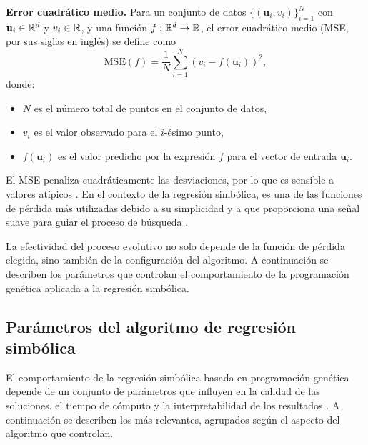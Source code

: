 \textbf{Error cuadrático medio.} Para un conjunto de datos \(\{(\mathbf{u}_i, v_i)\}_{i=1}^{N}\) con \(\mathbf{u}_i \in \mathbb{R}^d\) y \(v_i \in \mathbb{R}\), y una función \(f: \mathbb{R}^d \to \mathbb{R}\), el error cuadrático medio (MSE, por sus siglas en inglés) se define como \begin{equation} \text{MSE}(f) = \frac{1}{N} \sum_{i=1}^{N} \left( v_i - f(\mathbf{u}_i) \right)^2, \end{equation} donde: \begin{itemize} \item \(N\) es el número total de puntos en el conjunto de datos, \item \(v_i\) es el valor observado para el \(i\)-ésimo punto, \item \(f(\mathbf{u}_i)\) es el valor predicho por la expresión \(f\) para el vector de entrada \(\mathbf{u}_i\). \end{itemize} El MSE penaliza cuadráticamente las desviaciones, por lo que es sensible a valores atípicos \cite{hastie2009elements}. En el contexto de la regresión simbólica, es una de las funciones de pérdida más utilizadas debido a su simplicidad y a que proporciona una señal suave para guiar el proceso de búsqueda \cite{bishop2006pattern}.

La efectividad del proceso evolutivo no solo depende de la función de pérdida elegida, sino también de la configuración del algoritmo. A continuación se describen los parámetros que controlan el comportamiento de la programación genética aplicada a la regresión simbólica.

\subsection{Parámetros del algoritmo de regresión simbólica}

El comportamiento de la regresión simbólica basada en programación genética depende de un conjunto de parámetros que influyen en la calidad de las soluciones, el tiempo de cómputo y la interpretabilidad de los resultados \cite{cranmer2023pysr}. A continuación se describen los más relevantes, agrupados según el aspecto del algoritmo que controlan.

